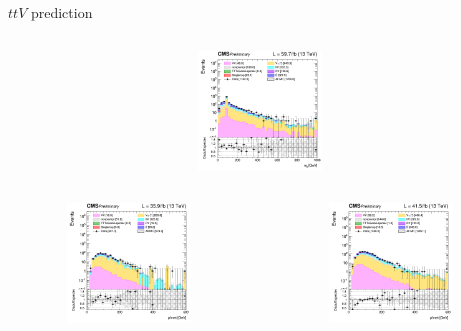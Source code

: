 \documentclass[8pt]{beamer}
\begin{document}
\begin{frame}{$ttV$ prediction}
\begin{columns}
\begin{column}{0.33\textwidth}
\begin{center}
			\vspace{-8pt}
			\begin{block}{}\end{block}\vspace{10pt}
     			\includegraphics[width=1.0\textwidth, height=90pt]{figs/2018/log_cratio_ttVCR_ll_mll.png}
    		\end{center}		
		\end{column}
\end{columns} \vspace{-5pt}
\begin{columns}
		\begin{column}{0.33\textwidth}
			\begin{center}
     			\includegraphics[width=1.0\textwidth, height=90pt]{figs/2016/log_cratio_ttVCR_ll_METcorrected_pt.png}
    		\end{center}		
		\end{column}
		\begin{column}{0.33\textwidth}
			\begin{center}
     			\includegraphics[width=1.0\textwidth, height=90pt]{figs/2017/log_cratio_ttVCR_ll_METcorrected_pt.png}
    		\end{center}		
		\end{column}

\end{columns}
\end{frame}
\end{document}

